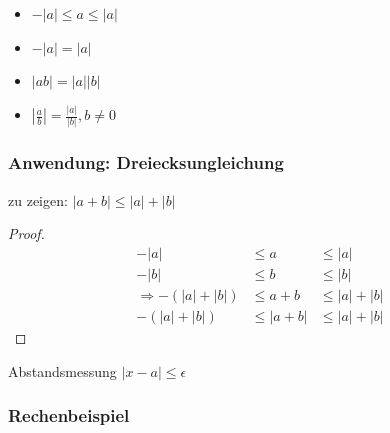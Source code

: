 \begin{itemize}
 \item $-|a|\leq a \leq |a|$
 \item $-|a| = |a|$
 \item $|ab| = |a||b|$
 \item $\displaystyle\left|\frac{a}{b}\right| = \frac{|a|}{|b|}, b\neq 0$
\end{itemize}

\subsubsection*{Anwendung: Dreiecksungleichung}
zu zeigen: $|a+b| \leq |a|+|b|$
\begin{proof}
  \begin{align*}
    -|a|&\leq a &\leq |a| \\
    -|b|&\leq b &\leq |b| \\
    \Rightarrow -(|a|+|b|)&\leq a+b &\leq |a|+|b| \\
    -(|a|+|b|)&\leq |a+b| &\leq |a|+|b|
  \end{align*}
\end{proof}

Abstandsmessung $|x-a| \leq \epsilon$

\subsubsection*{Rechenbeispiel}

